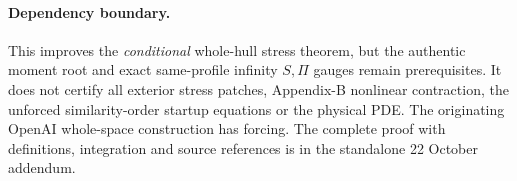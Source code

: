 \paragraph{Dependency boundary.}
This improves the \emph{conditional} whole-hull stress theorem,
but the authentic moment root and exact same-profile infinity
\(S,\Pi\) gauges remain prerequisites. It does not certify all
exterior stress patches, Appendix-B nonlinear contraction,
the unforced similarity-order startup equations or the physical
PDE. The originating OpenAI whole-space construction has forcing.
The complete proof with definitions, integration and source
references is in the standalone 22 October addendum.